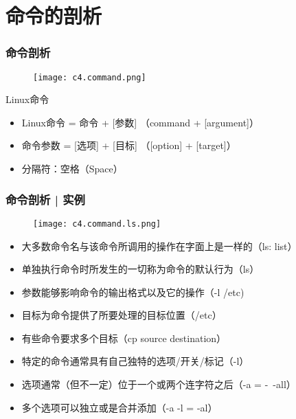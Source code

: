 \section{命令的剖析}
\begin{frame}
  \frametitle{\alert{命令剖析}}
  \begin{figure}
    \centering
    \texttt{[image: c4.command.png]}
  \end{figure}
  \pause
  \begin{block}{Linux命令}
    \begin{itemize}[<+->]
      \item Linux命令 = 命令 + [参数] （command + [argument]）
      \item 命令参数 = [选项] + [目标] （[option] + [target]）
      \item 分隔符：空格（Space）
    \end{itemize}
  \end{block}
\end{frame}

\begin{frame}
  \frametitle{命令剖析 | 实例}
  \begin{figure}
    \centering
    \texttt{[image: c4.command.ls.png]}
  \end{figure}
  \pause
  \begin{itemize}[<+->]
    \item 大多数命令名与该命令所调用的操作在字面上是一样的（ls: list）
    \item 单独执行命令时所发生的一切称为命令的默认行为（ls）
    \item 参数能够影响命令的输出格式以及它的操作（-l /etc)
    \item 目标为命令提供了所要处理的目标位置（/etc）
    \item 有些命令要求多个目标（cp source destination）
    \item 特定的命令通常具有自己独特的选项/开关/标记（-l）
    \item 选项通常（但不一定）位于一个或两个连字符之后（-a = -\ -all）
    \item 多个选项可以独立或是合并添加（-a -l = -al）
  \end{itemize}
\end{frame}


